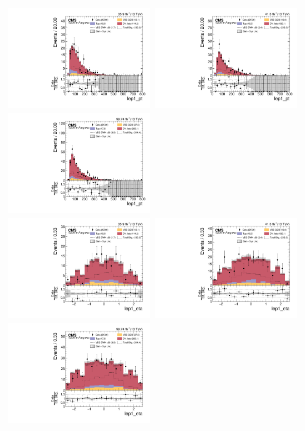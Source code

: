 \begin{figure}[!ht]
  \centering
  \includegraphics[width=0.335\textwidth]{analysis_plots/2016_zv/cr_vjets_e/lep1_pt.pdf} \hspace{-10pt}
  \includegraphics[width=0.335\textwidth]{analysis_plots/2017_zv/cr_vjets_e/lep1_pt.pdf} \hspace{-10pt}
  \includegraphics[width=0.335\textwidth]{analysis_plots/2018_zv/cr_vjets_e/lep1_pt.pdf} \hspace{-10pt} \\
  \includegraphics[width=0.335\textwidth]{analysis_plots/2016_zv/cr_vjets_e/lep1_eta.pdf} \hspace{-10pt}
  \includegraphics[width=0.335\textwidth]{analysis_plots/2017_zv/cr_vjets_e/lep1_eta.pdf} \hspace{-10pt}
  \includegraphics[width=0.335\textwidth]{analysis_plots/2018_zv/cr_vjets_e/lep1_eta.pdf} \hspace{-10pt} \\

\end{figure}

